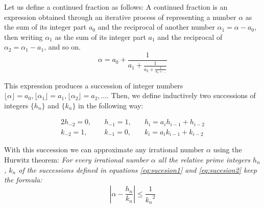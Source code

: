 \documentclass[prl,amsmath,amssymb, twocolumn, showpacs]{revtex4-1}
\begin{document}
Let us define a continued fraction as follows:
A continued fraction is an expression obtained through an iterative process of representing a number $\alpha$ as the sum of its integer part $a_0$ and the reciprocal of another number $\alpha_1=\alpha-a_0$, then writing $\alpha_1$ as the sum of its integer part $a_1$ and the reciprocal of $\alpha_2=\alpha_1-a_1$, and so on. 
\begin{equation*}
  \alpha = a_0 + \frac{1}{\displaystyle a_1
          + \frac{1}{\displaystyle a_2
          + \frac{1}{\displaystyle a_3 + \dots}}}
\end{equation*}

This expression produces a succession of integer numbers $\lfloor \alpha \rfloor=a_0,\lfloor \alpha_1 \rfloor=a_1, \lfloor \alpha_2 \rfloor=a_2, \dots$. 
Then, we define inductively two successions of integers $\{ h_n\}$ and $\{ k_n\}$ in the following way:

\begin{alignat}{2}
h_{-2} = 0,  &\quad h_{-1} = 1,  &\quad h_i=a_i h_{i-1}+h_{i-2}
\label{eq:sucesion1}
\\ 
k_{-2} = 1,  &\quad k_{-1} = 0,  &\quad k_i=a_i k_{i-1}+k_{i-2} 
\label{eq:sucesion2}
\end{alignat}

With this succession we can approximate any irrational number $\alpha$ using the Hurwitz theorem:
\emph{For every irrational number $\alpha$ all the relative prime integers $h_n$, $k_n$ of the successions defined in equations \ref{eq:sucesion1} and \ref{eq:sucesion2} keep the formula:}
\begin{equation}
|\alpha- \frac{h_n}{k_n}|\leq  \frac{1}{{k_n}^2} 
\end{equation}




\end{document}
